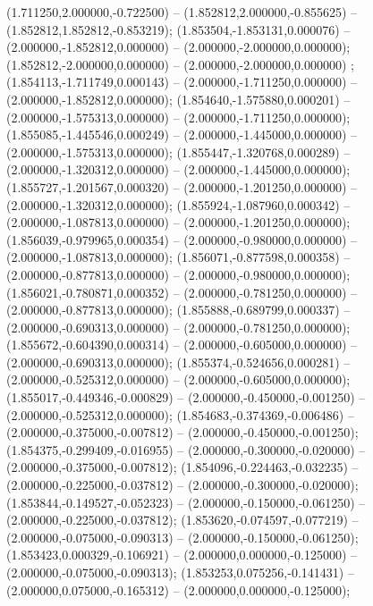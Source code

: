  (1.711250,2.000000,-0.722500) -- (1.852812,2.000000,-0.855625) -- (1.852812,1.852812,-0.853219);
 (1.853504,-1.853131,0.000076) -- (2.000000,-1.852812,0.000000) -- (2.000000,-2.000000,0.000000);
 (1.852812,-2.000000,0.000000) -- (2.000000,-2.000000,0.000000) ;
 (1.854113,-1.711749,0.000143) -- (2.000000,-1.711250,0.000000) -- (2.000000,-1.852812,0.000000);
 (1.854640,-1.575880,0.000201) -- (2.000000,-1.575313,0.000000) -- (2.000000,-1.711250,0.000000);
 (1.855085,-1.445546,0.000249) -- (2.000000,-1.445000,0.000000) -- (2.000000,-1.575313,0.000000);
 (1.855447,-1.320768,0.000289) -- (2.000000,-1.320312,0.000000) -- (2.000000,-1.445000,0.000000);
 (1.855727,-1.201567,0.000320) -- (2.000000,-1.201250,0.000000) -- (2.000000,-1.320312,0.000000);
 (1.855924,-1.087960,0.000342) -- (2.000000,-1.087813,0.000000) -- (2.000000,-1.201250,0.000000);
 (1.856039,-0.979965,0.000354) -- (2.000000,-0.980000,0.000000) -- (2.000000,-1.087813,0.000000);
 (1.856071,-0.877598,0.000358) -- (2.000000,-0.877813,0.000000) -- (2.000000,-0.980000,0.000000);
 (1.856021,-0.780871,0.000352) -- (2.000000,-0.781250,0.000000) -- (2.000000,-0.877813,0.000000);
 (1.855888,-0.689799,0.000337) -- (2.000000,-0.690313,0.000000) -- (2.000000,-0.781250,0.000000);
 (1.855672,-0.604390,0.000314) -- (2.000000,-0.605000,0.000000) -- (2.000000,-0.690313,0.000000);
 (1.855374,-0.524656,0.000281) -- (2.000000,-0.525312,0.000000) -- (2.000000,-0.605000,0.000000);
 (1.855017,-0.449346,-0.000829) -- (2.000000,-0.450000,-0.001250) -- (2.000000,-0.525312,0.000000);
 (1.854683,-0.374369,-0.006486) -- (2.000000,-0.375000,-0.007812) -- (2.000000,-0.450000,-0.001250);
 (1.854375,-0.299409,-0.016955) -- (2.000000,-0.300000,-0.020000) -- (2.000000,-0.375000,-0.007812);
 (1.854096,-0.224463,-0.032235) -- (2.000000,-0.225000,-0.037812) -- (2.000000,-0.300000,-0.020000);
 (1.853844,-0.149527,-0.052323) -- (2.000000,-0.150000,-0.061250) -- (2.000000,-0.225000,-0.037812);
 (1.853620,-0.074597,-0.077219) -- (2.000000,-0.075000,-0.090313) -- (2.000000,-0.150000,-0.061250);
 (1.853423,0.000329,-0.106921) -- (2.000000,0.000000,-0.125000) -- (2.000000,-0.075000,-0.090313);
 (1.853253,0.075256,-0.141431) -- (2.000000,0.075000,-0.165312) -- (2.000000,0.000000,-0.125000);
